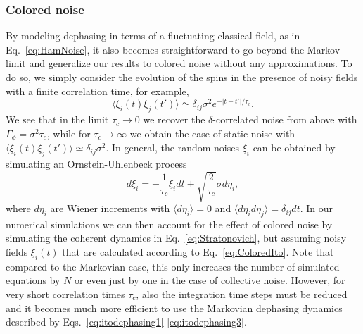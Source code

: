 \documentclass[pra,twocolumn,showpacs,preprintnumbers,amsmath,amssymb,superscriptaddress]{revtex4-1}
\newcommand{\erw}[1]{\langle#1\rangle}
\newcommand{\abs}[1]{\lvert#1\rvert}
\begin{document}
\subsubsection{Colored noise}
By modeling dephasing in terms of a fluctuating classical field, as in Eq.~\eqref{eq:HamNoise}, it also becomes straightforward to go beyond the Markov limit and generalize our results to colored noise without any approximations. To do so, we simply consider the evolution of the spins in the presence of noisy fields with a finite correlation time, for example,
\begin{equation}
\langle \xi_i(t)\xi_j(t')\rangle \simeq \delta_{ij} \sigma^2 e^{- \abs{t-t'}/\tau_{c}}.
\end{equation}
We see that in the limit $\tau_c \rightarrow 0$ we recover the $\delta$-correlated noise from above with $\Gamma_{\phi}=\sigma^2 \tau_{c}$, while for $\tau_c \rightarrow \infty$ we obtain the case of static noise with $\langle \xi_i(t)\xi_j(t')\rangle\simeq \delta_{ij}\sigma^2$.  In general, the random noises $\xi_i$ can be obtained by simulating an Ornstein-Uhlenbeck process~\cite{Uhlenbeck1930,Gardiner}
\begin{equation}\label{eq:ColoredIto}
d\xi_i=-\frac{1}{\tau_{c}} \xi_i dt+\sqrt{\frac{2}{\tau_{c}}} \sigma d\eta_i,
\end{equation}
where $d\eta_i$ are Wiener increments with $\erw{d\eta_i}=0$ and $\erw{d\eta_i d\eta_j}=\delta_{ij}dt$. In our numerical simulations we can then account for the effect of colored noise by simulating the coherent dynamics in Eq.~\eqref{eq:Stratonovich}, but assuming noisy fields $\xi_i(t)$ that are calculated according to Eq.~\eqref{eq:ColoredIto}. Note that compared to the Markovian case, this only increases the number of simulated equations by $N$ or even just by one in the case of collective noise. However, for very short correlation times $\tau_c$, also the integration time steps must be reduced and it becomes much more efficient to use the Markovian dephasing dynamics described by  Eqs.~\eqref{eq:itodephasing1}-\eqref{eq:itodephasing3}. 
\end{document}
